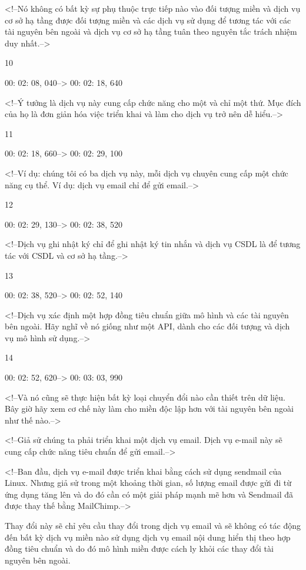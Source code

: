 <!--Nó không có bất kỳ sự phụ thuộc trực tiếp nào vào đối tượng miền và dịch vụ cơ sở hạ tầng được đối tượng miền và các dịch vụ sử dụng để tương tác với các tài nguyên bên ngoài và dịch vụ cơ sở hạ tầng tuân theo nguyên tắc trách nhiệm duy nhất.-->

10

00: 02: 08, 040--> 00: 02: 18, 640

<!--Ý tưởng là dịch vụ này cung cấp chức năng cho một và chỉ một thứ. Mục đích của họ là đơn giản hóa việc triển khai và làm cho dịch vụ trở nên dễ hiểu.-->

11

00: 02: 18, 660--> 00: 02: 29, 100

<!--Ví dụ: chúng tôi có ba dịch vụ này, mỗi dịch vụ chuyên cung cấp một chức năng cụ thể. Ví dụ: dịch vụ email chỉ để gửi email.-->

12

00: 02: 29, 130--> 00: 02: 38, 520

<!--Dịch vụ ghi nhật ký chỉ để ghi nhật ký tin nhắn và dịch vụ CSDL là để tương tác với CSDL và cơ sở hạ tầng.-->

13

00: 02: 38, 520--> 00: 02: 52, 140

<!--Dịch vụ xác định một hợp đồng tiêu chuẩn giữa mô hình và các tài nguyên bên ngoài. Hãy nghĩ về nó giống như một API, dành cho các đối tượng và dịch vụ mô hình sử dụng.-->

14

00: 02: 52, 620--> 00: 03: 03, 990

<!--Và nó cũng sẽ thực hiện bất kỳ loại chuyển đổi nào cần thiết trên dữ liệu. Bây giờ hãy xem cơ chế này làm cho miền độc lập hơn với tài nguyên bên ngoài như thế nào.-->

<!--Giả sử chúng ta phải triển khai một dịch vụ email. Dịch vụ e-mail này sẽ cung cấp chức năng tiêu chuẩn để gửi email.-->

<!--Ban đầu, dịch vụ e-mail được triển khai bằng cách sử dụng sendmail của Linux. Nhưng giả sử trong một khoảng thời gian, số lượng email được gửi đi từ ứng dụng tăng lên và do đó cần có một giải pháp mạnh mẽ hơn và Sendmail đã được thay thế bằng MailChimp.-->

Thay đổi này sẽ chỉ yêu cầu thay đổi trong dịch vụ email và sẽ không có tác động đến bất kỳ dịch vụ miền nào sử dụng dịch vụ email nội dung hiển thị theo hợp đồng tiêu chuẩn và do đó mô hình miền được cách ly khỏi các thay đổi tài nguyên bên ngoài.

